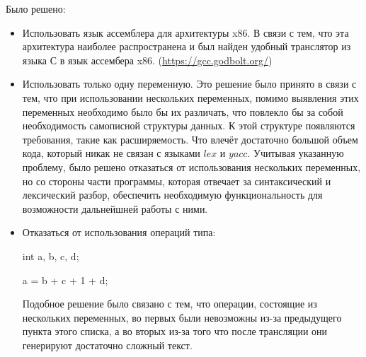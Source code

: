     Было решено:
    \begin{itemize}
        \item   Использовать язык ассемблера для архитектуры x86. 
                В связи с тем, что эта архитектура наиболее распространена 
                и был найден удобный транслятор из языка С в язык ассембера x86.
                (\href{https://gcc.godbolt.org/}{https://gcc.godbolt.org/})

        \item   Использовать только одну переменную. Это решение было принято
                в связи с тем, что при использовании нескольких переменных,
                помимо выявления этих переменных необходимо было бы их различать,
                что повлекло бы за собой необходимость самописной структуры данных.
                К этой структуре появляются требования, такие как расширяемость.
                Что влечёт достаточно большой объем кода, который никак не связан
                с языками $lex$ и $yacc$. Учитывая указанную проблему, было решено отказаться
                от использования нескольких переменных, но со стороны части программы, которая
                отвечает за синтаксический и лексический разбор, обеспечить необходимую функциональность для
                возможности дальнейшней работы с ними.

        \item   Отказаться от использования операций типа:
        
                int a, b, c, d;

                a = b + c + 1 + d;

                Подобное решение было связано с тем, что операции, состоящие из
                нескольких переменных, во первых были невозможны из-за предыдущего пункта
                этого списка, а во вторых из-за того что после трансляции они генерируют
                достаточно сложный текст. 

                \begin{figure}[h]
                    \label{fig:image}
                \end{figure}
        

\end{itemize}
